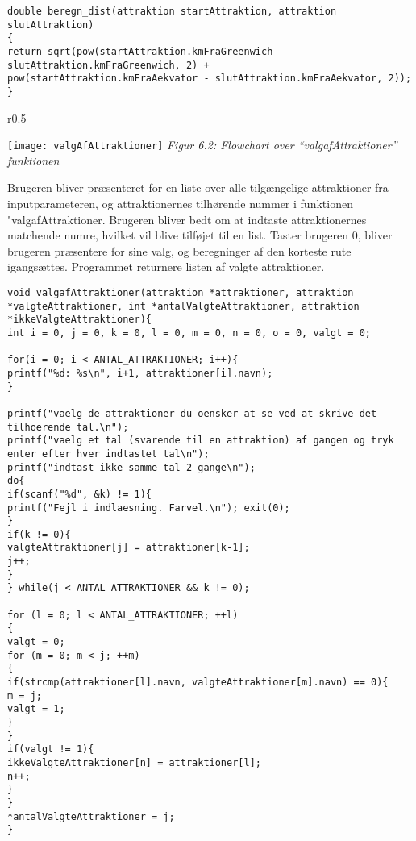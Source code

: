 \begin{lstlisting}
double beregn_dist(attraktion startAttraktion, attraktion slutAttraktion)
{
return sqrt(pow(startAttraktion.kmFraGreenwich - slutAttraktion.kmFraGreenwich, 2) + 
pow(startAttraktion.kmFraAekvator - slutAttraktion.kmFraAekvator, 2));
}
\end{lstlisting}

\begin{wrapfigure}{r}{0.5\textwidth}
	\vspace{0pt}
	\begin{center}
		\texttt{[image: valgAfAttraktioner]}\newline
		\textit{Figur 6.2: Flowchart over “valgafAttraktioner” funktionen}
	\end{center}
	\vspace{0pt}
	\vspace{0pt}
\end{wrapfigure}

Brugeren bliver præsenteret for en liste over alle tilgængelige attraktioner fra inputparameteren, og attraktionernes tilhørende nummer i funktionen "valgafAttraktioner. Brugeren bliver bedt om at indtaste attraktionernes matchende numre, hvilket vil blive tilføjet til en list. Taster brugeren 0, bliver brugeren præsentere for sine valg, og beregninger af den korteste rute igangsættes. Programmet returnere listen af valgte attraktioner. \newline

\begin{lstlisting}
void valgafAttraktioner(attraktion *attraktioner, attraktion *valgteAttraktioner, int *antalValgteAttraktioner, attraktion *ikkeValgteAttraktioner){
int i = 0, j = 0, k = 0, l = 0, m = 0, n = 0, o = 0, valgt = 0;

for(i = 0; i < ANTAL_ATTRAKTIONER; i++){
printf("%d: %s\n", i+1, attraktioner[i].navn);
}

printf("vaelg de attraktioner du oensker at se ved at skrive det tilhoerende tal.\n");
printf("vaelg et tal (svarende til en attraktion) af gangen og tryk enter efter hver indtastet tal\n");
printf("indtast ikke samme tal 2 gange\n");
do{
if(scanf("%d", &k) != 1){
printf("Fejl i indlaesning. Farvel.\n"); exit(0);
}
if(k != 0){
valgteAttraktioner[j] = attraktioner[k-1];
j++;
}
} while(j < ANTAL_ATTRAKTIONER && k != 0);

for (l = 0; l < ANTAL_ATTRAKTIONER; ++l)
{
valgt = 0;
for (m = 0; m < j; ++m)
{
if(strcmp(attraktioner[l].navn, valgteAttraktioner[m].navn) == 0){
m = j;
valgt = 1;
}	
}
if(valgt != 1){
ikkeValgteAttraktioner[n] = attraktioner[l];
n++;
}
}
*antalValgteAttraktioner = j;
}
\end{lstlisting}

